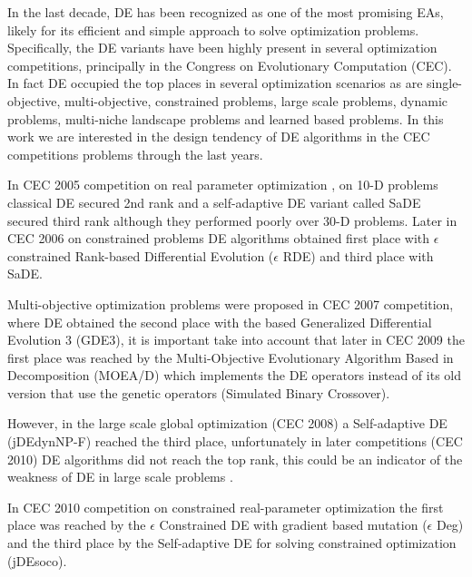 In the last decade, DE has been recognized as one of the most promising EAs, likely for its efficient and simple approach to solve optimization problems.
%
Specifically, the DE variants have been highly present in several optimization competitions, principally in the Congress on Evolutionary Computation (CEC).
%
In fact DE occupied the top places in several optimization scenarios as are single-objective, multi-objective, constrained problems, large scale problems, dynamic problems, multi-niche landscape problems and learned based problems.
%
In this work we are interested in the design tendency of DE algorithms in the CEC competitions problems through the last years.
%

In CEC 2005 competition on real parameter optimization \cite{CEC2005}, on 10-D problems classical DE secured 2nd rank and a self-adaptive DE variant called SaDE secured third rank although they performed poorly over 30-D problems.
%
Later in CEC 2006 on constrained problems \cite{CEC2006} DE algorithms obtained first place with $\epsilon$ constrained Rank-based Differential Evolution ($\epsilon$ RDE) and third place with SaDE.
%

Multi-objective optimization problems were proposed in CEC 2007 \cite{CEC2007} competition, where DE obtained the second place with the based Generalized Differential Evolution 3 (GDE3), it is important take into account that later in CEC 2009 the first place was reached by the Multi-Objective Evolutionary Algorithm Based in Decomposition (MOEA/D) which implements the DE operators instead of its old version that use the genetic operators (Simulated Binary Crossover).

%
However, in the large scale global optimization (CEC 2008) \cite{CEC2008} a Self-adaptive DE (jDEdynNP-F) reached the third place, unfortunately in later competitions (CEC 2010) DE algorithms did not reach the top rank, this could be an indicator of the weakness of DE in large scale problems \cite{segura2015improving}.

In CEC 2010 competition on constrained real-parameter optimization \cite{CEC2010} the first place was reached by the $\epsilon$ Constrained DE with gradient based mutation ($\epsilon$ Deg) and the third place by the Self-adaptive DE for solving constrained optimization (jDEsoco).

